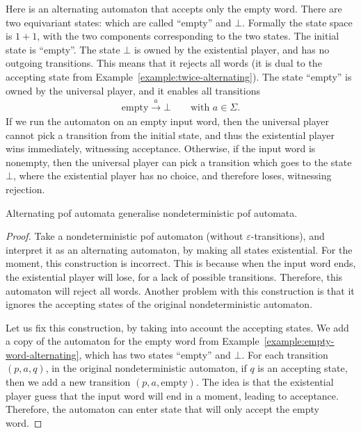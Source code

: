 \begin{myexample} \label{example:empty-word-alternating} 
	Here is an alternating automaton that accepts only the empty word. There are two equivariant states: which are called  ``empty'' and $\bot$. Formally  the state space is $1+1$, with the two components corresponding to the two states. The initial state is ``empty''. The state $\bot$ is owned by the existential player, and  has no outgoing transitions. This means that it rejects all words (it is dual to the accepting state from Example~\ref{example:twice-alternating}). The state ``empty'' is owned by the universal player, and it enables all transitions 
	\begin{align*}
	\text{empty} \stackrel a \to \bot \qquad \text{with $a \in \Sigma$}.
	\end{align*}
	If we run the automaton on an empty input word, then the universal player cannot pick a transition from the initial state, and thus  the existential player wins immediately,  witnessing acceptance. Otherwise, if the input word is nonempty, then the universal player can pick a transition which goes to the state $\bot$, where the existential player has no choice, and therefore loses, witnessing rejection. 
\end{myexample}


\begin{theorem}
	Alternating pof automata generalise nondeterministic pof automata.
\end{theorem}
\begin{proof}
	Take a nondeterministic pof automaton (without $\varepsilon$-transitions), and interpret it as an alternating automaton, by making all states existential. For the moment, this construction is incorrect. This is because when the input word ends, the existential player will lose, for a lack of possible transitions. Therefore, this automaton will reject all words. Another problem with this construction is that it ignores the accepting states of the original nondeterministic automaton.

	Let us fix this construction, by taking into account the accepting states. We add a copy of the automaton for the empty word from Example~\ref{example:empty-word-alternating}, which has two states ``empty'' and $\bot$. For each transition $(p,a,q)$, in the original nondeterministic automaton, if $q$ is an accepting state, then we add a new transition $(p,a,\text{empty})$. The idea is that the existential player guess that the input word will end in a moment,  leading to acceptance. Therefore, the automaton can enter state that will only accept the empty word.  
\end{proof}

